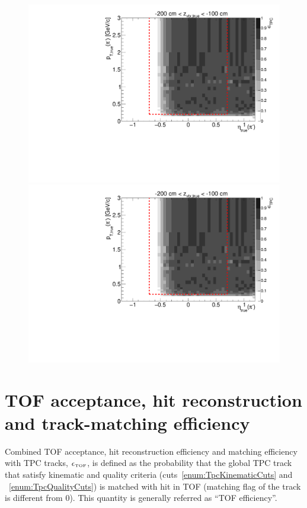 \begin{figure}[hb]
{  \includegraphics[width=\linewidth,page=16]{graphics/eff/Eff2D_TPC_pion_Minus.pdf}\\
  \includegraphics[width=\linewidth,page=18]{graphics/eff/Eff2D_TPC_pion_Minus.pdf}
}%
\end{figure}






\section{TOF acceptance, hit reconstruction and track-matching efficiency}\label{sec:tofMatchEff}

Combined TOF acceptance, hit reconstruction efficiency and matching efficiency with TPC tracks, $\epsilon_{\textrm{\tiny TOF}}$, is defined as the probability that the global TPC track that satisfy kinematic and quality criteria (cuts~\ref{enum:TpcKinematicCuts} and ~\ref{enum:TpcQualityCuts}) is matched with hit in TOF (matching flag of the track is different from 0). This quantity is generally referred as ``TOF efficiency''.

